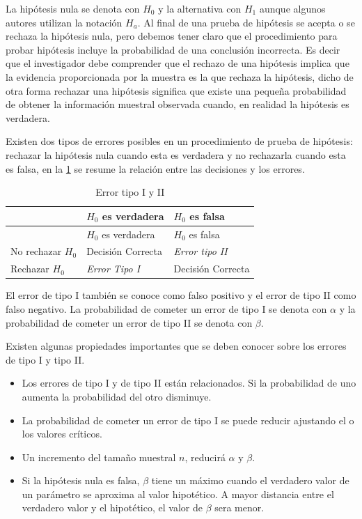 \documentclass[]{book}
\providecommand{\tightlist}{%
  \setlength{\itemsep}{0pt}\setlength{\parskip}{0pt}}
\begin{document}
La hipótesis nula se denota con \(H_0\) y la alternativa con \(H_1\) aunque algunos autores utilizan la notación \(H_a\). Al final de una prueba de hipótesis se acepta o se rechaza la hipótesis nula, pero debemos tener claro que el procedimiento para probar hipótesis incluye la probabilidad de una conclusión incorrecta. Es decir que el investigador debe comprender que el rechazo de una hipótesis implica que la evidencia proporcionada por la muestra es la que rechaza la hipótesis, dicho de otra forma rechazar una hipótesis significa que existe una pequeña probabilidad de obtener la información muestral observada cuando, en realidad la hipótesis es verdadera.

Existen dos tipos de errores posibles en un procedimiento de prueba de hipótesis: rechazar la hipótesis nula cuando esta es verdadera y no rechazarla cuando esta es falsa, en la \ref{tab:err} se resume la relación entre las decisiones y los errores.

\begin{longtable}[]{@{}lll@{}}
\caption{\label{tab:err}Error tipo I y II}\tabularnewline
\toprule
& \(H_0\) es verdadera & \(H_0\) es falsa\tabularnewline
\midrule
\endfirsthead
\toprule
& \(H_0\) es verdadera & \(H_0\) es falsa\tabularnewline
\midrule
\endhead
No rechazar \(H_0\) & Decisión Correcta & \emph{Error tipo II}\tabularnewline
Rechazar \(H_0\) & \emph{Error Tipo I} & Decisión Correcta\tabularnewline
\bottomrule
\end{longtable}

El error de tipo I también se conoce como falso positivo y el error de tipo II como falso negativo. La probabilidad de cometer un error de tipo I se denota con \(\alpha\) y la probabilidad de cometer un error de tipo II se denota con \(\beta\).

Existen algunas propiedades importantes que se deben conocer sobre los errores de tipo I y tipo II.

\begin{itemize}
\tightlist
\item
  Los errores de tipo I y de tipo II están relacionados. Si la probabilidad de uno aumenta la probabilidad del otro disminuye.
\item
  La probabilidad de cometer un error de tipo I se puede reducir ajustando el o los valores críticos.
\item
  Un incremento del tamaño muestral \(n\), reducirá \(\alpha\) y \(\beta\).
\item
  Si la hipótesis nula es falsa, \(\beta\) tiene un máximo cuando el verdadero valor de un parámetro se aproxima al valor hipotético. A mayor distancia
  entre el verdadero valor y el hipotético, el valor de \(\beta\) sera menor.
\end{itemize}
\end{document}
